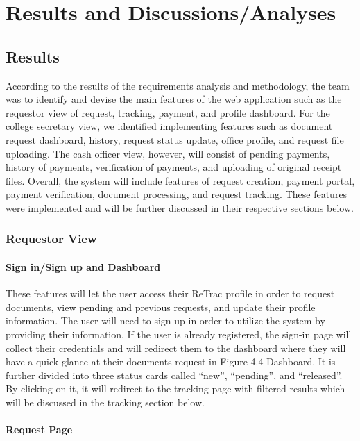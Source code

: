 \chapter{Results and Discussions/Analyses}

\section{Results}

According to the results of the requirements analysis and methodology, the team was to identify and devise the main features of the web application such as the requestor view of request, tracking, payment, and profile dashboard. For the college secretary view, we identified implementing features such as document request dashboard, history, request status update, office profile, and request file uploading. The cash officer view, however, will consist of pending payments, history of payments, verification of payments, and uploading of original receipt files. Overall, the system will include features of request creation, payment portal, payment verification, document processing, and request tracking. These features were implemented and will be further discussed in their respective sections below.

\subsection{Requestor View}

\subsubsection{Sign in/Sign up and Dashboard}

These features will let the user access their ReTrac profile in order to request documents, view pending and previous requests, and update their profile information. The user will need to sign up in order to utilize the system by providing their information. If the user is already registered, the sign-in page will collect their credentials and will redirect them to the dashboard where they will have a quick glance at their documents request in Figure 4.4 Dashboard. It is further divided into three status cards called “new”, “pending”, and “released”. By clicking on it, it will redirect to the tracking page with filtered results which will be discussed in the tracking section below.

\subsubsection{Request Page}

